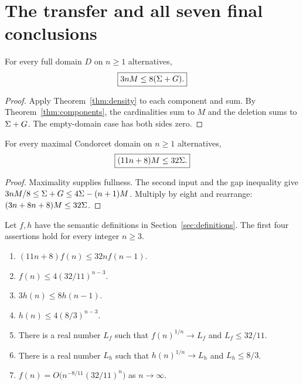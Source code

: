 \section{The transfer and all seven final conclusions}\label{sec:conclusions}
\begin{theorem}\label{thm:second}
For every full domain \(D\) on \(n\geq1\) alternatives,
\[
 \boxed{3nM\leq8(\Sigma+G).}
\]
\end{theorem}
\begin{proof}
Apply Theorem~\ref{thm:density} to each component and sum. By
Theorem~\ref{thm:components}, the cardinalities sum to \(M\) and the
deletion sums to \(\Sigma+G\). The empty-domain case has both sides zero.
\end{proof}

\begin{theorem}\label{thm:transfer}
For every maximal Condorcet domain on \(n\geq1\) alternatives,
\[
 \boxed{(11n+8)M\leq32\Sigma.}
\]
\end{theorem}
\begin{proof}
Maximality supplies fullness. The second input and the gap inequality
give \(3nM/8\leq\Sigma+G\leq4\Sigma-(n+1)M\). Multiply by eight
and rearrange: \((3n+8n+8)M\leq32\Sigma\).
\end{proof}

\begin{theorem}\label{thm:final}
Let \(f,h\) have the semantic definitions in Section~\ref{sec:definitions}.
The first four assertions hold for every integer \(n\geq3\).
\begin{enumerate}[label=E\arabic*.]
\item \((11n+8)f(n)\leq32n f(n-1)\).
\item \(f(n)\leq4(32/11)^{n-3}\).
\item \(3h(n)\leq8h(n-1)\).
\item \(h(n)\leq4(8/3)^{n-3}\).
\item There is a real number \(L_f\) such that
\(f(n)^{1/n}\to L_f\) and \(L_f\leq32/11\).
\item There is a real number \(L_h\) such that
\(h(n)^{1/n}\to L_h\) and \(L_h\leq8/3\).
\item \(f(n)=O\bigl(n^{-8/11}(32/11)^n\bigr)\) as \(n\to\infty\).
\end{enumerate}
\end{theorem}

